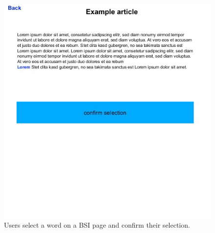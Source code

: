 \begin{figure}[h]  
    \centering
    \includegraphics[page=1,width=.8\textwidth]{Pictures/link_to_bsi_3.jpg}
    \caption{Users select a word on a BSI page and confirm their selection.}
\end{figure}


